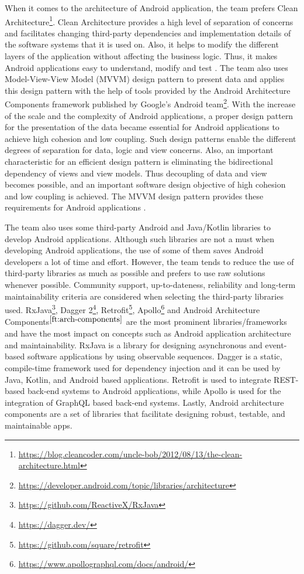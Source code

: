 When it comes to the architecture of Android application, the team prefers Clean Architecture\footnote{\url{https://blog.cleancoder.com/uncle-bob/2012/08/13/the-clean-architecture.html}}. Clean Architecture provides a high level of separation of concerns \cite{56} and facilitates changing third-party dependencies and implementation details of the software systems that it is used on. Also, it helps to modify the different layers of the application without affecting the business logic. Thus, it makes Android applications easy to understand, modify and test \cite{47}. The team also uses Model-View-View Model (MVVM) design pattern to present data and applies this design pattern with the help of tools provided by the Android Architecture Components framework published by Google's Android team\footnote{\url{https://developer.android.com/topic/libraries/architecture}\label{ft:arch-components}}. With the increase of the scale and the complexity of Android applications, a proper design pattern for the presentation of the data became essential for Android applications to achieve high cohesion and low coupling. Such design patterns enable the different degrees of separation for data, logic and view concerns. Also, an important characteristic for an efficient design pattern is eliminating the bidirectional dependency of views and view models. Thus decoupling of data and view becomes possible, and an important software design objective of high cohesion and low coupling is achieved. The MVVM design pattern provides these requirements for Android applications \cite{48}.

The team also uses some third-party Android and Java/Kotlin libraries to develop Android applications. Although such libraries are not a must when developing Android applications, the use of some of them saves Android developers a lot of time and effort. However, the team tends to reduce the use of third-party libraries as much as possible and prefers to use raw solutions whenever possible. Community support, up-to-dateness, reliability and long-term maintainability criteria are considered when selecting the third-party libraries used. RxJava\footnote{\url{https://github.com/ReactiveX/RxJava}}, Dagger 2\footnote{\url{https://dagger.dev/}}, Retrofit\footnote{\url{https://github.com/square/retrofit}}, Apollo\footnote{\url{https://www.apollographql.com/docs/android/}} and Android Architecture Components$^{\ref{ft:arch-components}}$ are the most prominent libraries/frameworks and have the most impact on concepts such as Android application architecture and maintainability. RxJava is a library for designing asynchronous and event-based software applications by using observable sequences. Dagger is a static, compile-time framework used for dependency injection and it can be used by Java, Kotlin, and Android based applications. Retrofit is used to integrate REST-based back-end systems to Android applications, while Apollo is used for the integration of GraphQL based back-end systems. Lastly, Android architecture components are a set of libraries that facilitate designing robust, testable, and maintainable apps.